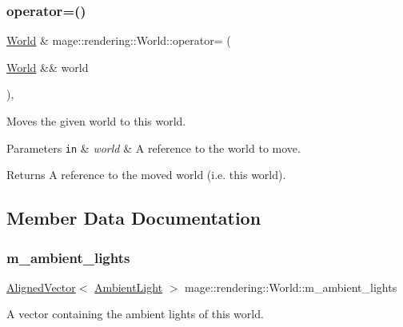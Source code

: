 \subsubsection{\texorpdfstring{operator=()}{operator=()}\hspace{0.1cm}{\footnotesize\ttfamily [2/2]}}
{\footnotesize\ttfamily \hyperlink{classmage_1_1rendering_1_1_world}{World} \& mage\+::rendering\+::\+World\+::operator= (\begin{DoxyParamCaption}\item[{\hyperlink{classmage_1_1rendering_1_1_world}{World} \&\&}]{world }\end{DoxyParamCaption})\hspace{0.3cm}{\ttfamily [default]}, {\ttfamily [noexcept]}}

Moves the given world to this world.


\begin{DoxyParams}[1]{Parameters}
\mbox{\tt in}  & {\em world} & A reference to the world to move. \\
\hline
\end{DoxyParams}
\begin{DoxyReturn}{Returns}
A reference to the moved world (i.\+e. this world). 
\end{DoxyReturn}


\subsection{Member Data Documentation}
\hypertarget{classmage_1_1rendering_1_1_world_a0c63647dbf30b3df91e6cfbb483847c9}{}\label{classmage_1_1rendering_1_1_world_a0c63647dbf30b3df91e6cfbb483847c9} 
\subsubsection{\texorpdfstring{m\+\_\+ambient\+\_\+lights}{m\_ambient\_lights}}
{\footnotesize\ttfamily \hyperlink{namespacemage_a8664bfb5ce2179fc64eae9f82c8a5ba8}{Aligned\+Vector}$<$ \hyperlink{classmage_1_1rendering_1_1_ambient_light}{Ambient\+Light} $>$ mage\+::rendering\+::\+World\+::m\+\_\+ambient\+\_\+lights\hspace{0.3cm}{\ttfamily [private]}}

A vector containing the ambient lights of this world. \hypertarget{classmage_1_1rendering_1_1_world_a58ea474801fba5e39ff4f8a7d4c0a842}{}\label{classmage_1_1rendering_1_1_world_a58ea474801fba5e39ff4f8a7d4c0a842} 
